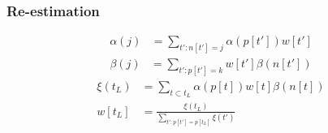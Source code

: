 \documentclass{beamer}
\begin{document}
\begin{frame}
  \frametitle{Re-estimation}
  \begin{align*}
    \alpha(j)&= \sum_{t':n[t']=j} \alpha(p[t']) w[t']
  \end{align*}
  \begin{align*}
    \beta(j)&= \sum_{t':p[t']=k} w[t'] \beta(n[t'])
  \end{align*}
  \begin{align*}
    \xi(t_L)  &= \sum_{t\subset t_L}\alpha(p[t])w[t]\beta(n[t])\\
    w[t_L] &= \frac{\xi(t_L)}{\sum_{t':p[t']=p[t_L]}\xi(t')}
  \end{align*}
\end{frame}
\end{document}
